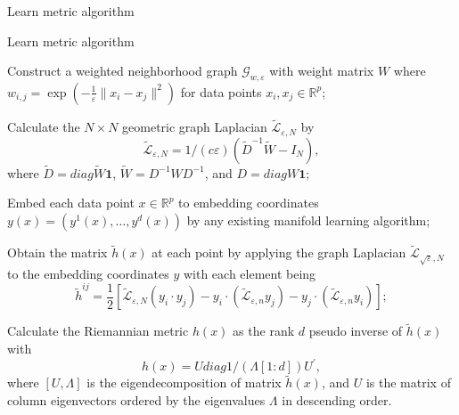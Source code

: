 \documentclass[11pt,a4paper,]{article}
\begin{document}
Learn metric algorithm

\begin{algorithm}[!htb]
  \caption{Learn metric algorithm}
  \label{alg:learnmetric}
  \DontPrintSemicolon
  \SetAlgoLined
  \BlankLine
  \begin{algorithmic}[1]

  \STATE Construct a weighted neighborhood graph $\mathcal{G}_{w,\varepsilon}$ with weight matrix $W$ where $w_{i,j}=\exp(-\frac{1}{\varepsilon}\|x_i-x_j\|^2)$ for data points $x_i,x_j \in \mathbb{R}^p$;

  \STATE Calculate the $N\times N$ geometric graph Laplacian $\widetilde{\mathcal{L}}_{\varepsilon,N}$ by
  $$
  \widetilde{\mathcal{L}}_{\varepsilon,N} = 1/(c\varepsilon)(\widetilde{D}^{-1} \widetilde{W} - I_N),
  $$
  where $\widetilde{D}=diag{\widetilde{W}\pmb{1}}$, $\widetilde{W} = D^{-1}WD^{-1}$, and $D = diag{W\pmb{1}}$;

  \STATE Embed each data point $x\in \mathbb{R}^p$ to embedding coordinates $y(x)=(y^1(x),\dots,y^d(x))$ by any existing manifold learning algorithm;

  \STATE Obtain the matrix $\tilde{h}(x)$ at each point by applying the graph Laplacian $\widetilde{\mathcal{L}}_{\sqrt{\varepsilon},N}$ to the embedding coordinates $y$ with each element being
  $$
    \tilde{h}^{i j}=\frac{1}{2}\left[\tilde{\mathcal{L}}_{\varepsilon, N}\left(y_i \cdot y_j\right)-y_i \cdot\left(\tilde{\mathcal{L}}_{\varepsilon, n} y_j\right)-y_j \cdot\left(\tilde{\mathcal{L}}_{\varepsilon, n} y_i\right)\right];
  $$

  \STATE Calculate the Riemannian metric $h(x)$ as the rank $d$ pseudo inverse of $\tilde{h}(x)$ with 
  $$
    h(x) = U diag{1/(\Lambda[1:d])} U^\prime,
  $$
  where $[U, \Lambda]$ is the eigendecomposition of matrix $\tilde{h}(x)$, and $U$ is the matrix of column eigenvectors ordered by the eigenvalues $\Lambda$ in descending order.

  \end{algorithmic}
\end{algorithm}
\end{document}
